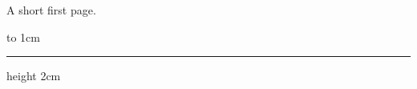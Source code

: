 \documentclass{article}
\begin{document}
A short first page.
\pagebreak

\vbox to 1cm{\hrule height 2cm}
\end{document}
